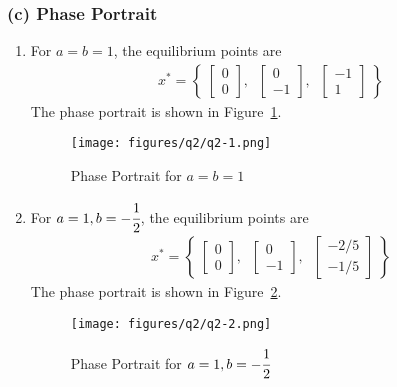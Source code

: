\subsubsection*{(c) Phase Portrait}

\begin{enumerate}[label= (\roman*)]
    \item For \( a = b = 1 \), the equilibrium points are
          \begin{align*}
              x^* =
              \left \{ \;
              \begin{bmatrix}
                  0 \\
                  0
              \end{bmatrix}, \; \;
              \begin{bmatrix}
                  0 \\
                  -1
              \end{bmatrix}, \; \;
              \begin{bmatrix}
                  -1 \\
                  1
              \end{bmatrix} \;
              \right \}
          \end{align*}
          The phase portrait is shown in Figure~\ref{fig:q2-1}.
          \begin{figure}[!ht]
              \centering
              \texttt{[image: figures/q2/q2-1.png]}
              \vspace*{-2.5em}
              \caption{
                  Phase Portrait for \( a = b = 1 \)
              }\label{fig:q2-1}
          \end{figure}

    \item For \( a = 1, b = -\cfrac{1}{2} \), the equilibrium points are
          \begin{align*}
              x^* =
              \left \{ \;
              \begin{bmatrix}
                  0 \\
                  0
              \end{bmatrix}, \; \;
              \begin{bmatrix}
                  0 \\
                  -1
              \end{bmatrix}, \; \;
              \begin{bmatrix}
                  -2/5 \\
                  -1/5
              \end{bmatrix} \;
              \right \}
          \end{align*}
          The phase portrait is shown in Figure~\ref{fig:q2-2}.
          \begin{figure}[!ht]
              \centering
              \texttt{[image: figures/q2/q2-2.png]}
              \vspace*{-2.5em}
              \caption{
                  Phase Portrait for \( a = 1, b = -\cfrac{1}{2} \)
              }\label{fig:q2-2}
          \end{figure}
\end{enumerate}
